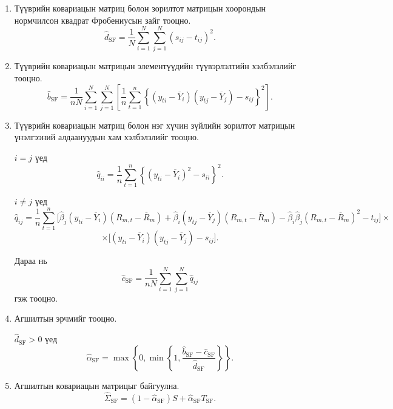\begin{enumerate}
	Эдгээр элементүүдээр
	$T_{\mathrm{SF}}=(t_{ij})$
	матрицыг байгуулна.
	
	\item Түүврийн ковариацын матриц болон
	зорилтот матрицын хоорондын нормчилсон
	квадрат Фробениусын зайг тооцно.
	\[
	\widehat d_{\mathrm{SF}}
	=
	\frac{1}{N}
	\sum_{i=1}^{N}
	\sum_{j=1}^{N}
	(s_{ij}-t_{ij})^2.
	\]
	
	\item Түүврийн ковариацын матрицын
	элементүүдийн түүвэрлэлтийн
	хэлбэлзлийг тооцно.
	\[
	\widehat b_{\mathrm{SF}}
	=
	\frac{1}{nN}
	\sum_{i=1}^{N}
	\sum_{j=1}^{N}
	\left[
	\frac{1}{n}
	\sum_{t=1}^{n}
	\left\{
	(y_{ti}-\overline{Y}_i)
	(y_{tj}-\overline{Y}_j)
	-s_{ij}
	\right\}^{2}
	\right].
	\]
	
	\item Түүврийн ковариацын матриц
	болон нэг хүчин зүйлийн зорилтот
	матрицын үнэлгээний алдаануудын
	хам хэлбэлзлийг тооцно.
	
	$i=j$ үед
	\[
	\widehat q_{ii}
	=
	\frac{1}{n}
	\sum_{t=1}^{n}
	\left\{
	(y_{ti}-\overline{Y}_i)^2-s_{ii}
	\right\}^{2}.
	\]
	
	$i\neq j$ үед
\[
\widehat q_{ij}
=
\frac{1}{n}
\sum_{t=1}^{n}
\Big[
\widehat{\beta}_j
(y_{ti}-\overline{Y}_i)
(R_{m,t}-\overline{R}_m)
+
\widehat{\beta}_i
(y_{tj}-\overline{Y}_j)
(R_{m,t}-\overline{R}_m)
-
\widehat{\beta}_i\widehat{\beta}_j
(R_{m,t}-\overline{R}_m)^2
-t_{ij}
\Big]\times
\]
\[\times
\Big[
(y_{ti}-\overline{Y}_i)
(y_{tj}-\overline{Y}_j)-s_{ij}
\Big].
\]
	
	Дараа нь
	\[
	\widehat c_{\mathrm{SF}}
	=
	\frac{1}{nN}
	\sum_{i=1}^{N}
	\sum_{j=1}^{N}
	\widehat q_{ij}
	\]
	гэж тооцно.
	
	\item Агшилтын эрчмийг тооцно.
	
	$\widehat d_{\mathrm{SF}}>0$ үед
	\[
	\widehat{\alpha}_{\mathrm{SF}}
	=
	\max
	\left\{
	0,
	\min
	\left\{
	1,
	\frac{
		\widehat b_{\mathrm{SF}}
		-
		\widehat c_{\mathrm{SF}}
	}{
		\widehat d_{\mathrm{SF}}
	}
	\right\}
	\right\}.
	\]
	
	\item Агшилтын ковариацын
	матрицыг байгуулна.
	\[
	\widehat{\Sigma}_{\mathrm{SF}}
	=
	(1-\widehat{\alpha}_{\mathrm{SF}})S
	+
	\widehat{\alpha}_{\mathrm{SF}}T_{\mathrm{SF}}.
	\]
	
\end{enumerate}